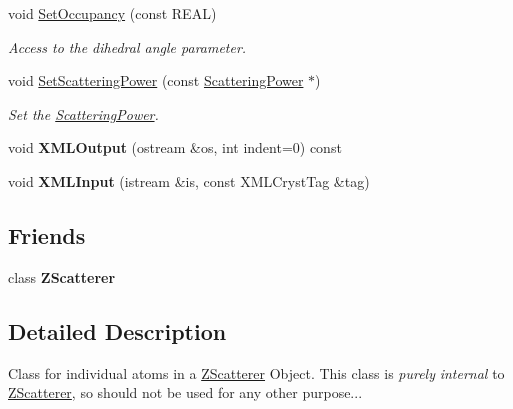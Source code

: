 \begin{DoxyCompactItemize}
\mbox{\label{class_obj_cryst_1_1_z_atom_a75e0ae656bb50d29cc511a5ef87ed45f}} 
void \mbox{\hyperlink{class_obj_cryst_1_1_z_atom_a75e0ae656bb50d29cc511a5ef87ed45f}{Set\+Occupancy}} (const R\+E\+AL)
\begin{DoxyCompactList}\small\item\em Access to the dihedral angle parameter. \end{DoxyCompactList}\item 
\mbox{\label{class_obj_cryst_1_1_z_atom_a2ca9cf4a73457c2a2645c780cf3175c1}} 
void \mbox{\hyperlink{class_obj_cryst_1_1_z_atom_a2ca9cf4a73457c2a2645c780cf3175c1}{Set\+Scattering\+Power}} (const \mbox{\hyperlink{class_obj_cryst_1_1_scattering_power}{Scattering\+Power}} $\ast$)
\begin{DoxyCompactList}\small\item\em Set the \mbox{\hyperlink{class_obj_cryst_1_1_scattering_power}{Scattering\+Power}}. \end{DoxyCompactList}\item 
\mbox{\label{class_obj_cryst_1_1_z_atom_a92349448880fd3b33a4bec47da815d95}} 
void {\bfseries X\+M\+L\+Output} (ostream \&os, int indent=0) const
\item 
\mbox{\label{class_obj_cryst_1_1_z_atom_a86561067f1c11ed584f94da62b921356}} 
void {\bfseries X\+M\+L\+Input} (istream \&is, const X\+M\+L\+Cryst\+Tag \&tag)
\end{DoxyCompactItemize}
\subsection*{Friends}
\begin{DoxyCompactItemize}
\item 
\mbox{\label{class_obj_cryst_1_1_z_atom_a1a78ff190d815e7f00791ac526f74e91}} 
class {\bfseries Z\+Scatterer}
\end{DoxyCompactItemize}


\subsection{Detailed Description}
Class for individual atoms in a \mbox{\hyperlink{class_obj_cryst_1_1_z_scatterer}{Z\+Scatterer}} Object. This class is {\itshape purely} {\itshape internal} to \mbox{\hyperlink{class_obj_cryst_1_1_z_scatterer}{Z\+Scatterer}}, so should not be used for any other purpose... 

